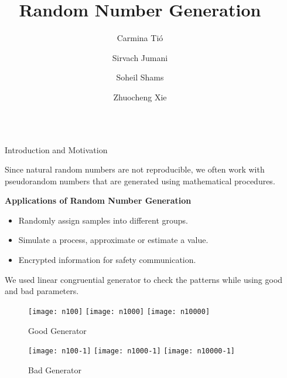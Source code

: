 \documentclass[final]{beamer}
\title{Random Number Generation}
\author{Carmina Tió \and Sirvach Jumani  \and Soheil Shams \and Zhuocheng Xie }
\newlength{\sepwidth}
\newlength{\colwidth}
\newcommand{\separatorcolumn}{\begin{column}{\sepwidth}\end{column}}
\begin{document}
{}
\large
\begin{frame}[t]
\begin{columns}[t]
\separatorcolumn

\begin{column}{\colwidth}

  \begin{block}{Introduction and Motivation}

    Since natural random numbers are not reproducible, we often work with pseudorandom numbers that are generated using mathematical procedures.
    
   \textbf{Applications of Random Number Generation}
   \vspace{-1cm}
   \begin{itemize}
   \item Randomly assign samples into different groups.
   \item Simulate a process, approximate or estimate a value.
   \item Encrypted information for safety communication.
   \end{itemize}
  
  We used linear congruential generator to check the patterns while using good and bad parameters. 
  \begin{figure}
   \begin{center}
   	\texttt{[image: n100]}
   	\texttt{[image: n1000]}   
   	\texttt{[image: n10000]} 
   	\vspace{-1cm}
   	\caption{Good Generator}
   	\texttt{[image: n100-1]}
   	\texttt{[image: n1000-1]}   
   	\texttt{[image: n10000-1]} 
   	\vspace{-1cm} 
   	\caption{Bad Generator}
   \end{center}  
  \end{figure}
  \end{block}
  

\end{column}
\end{columns}
\end{frame}
\end{document}

